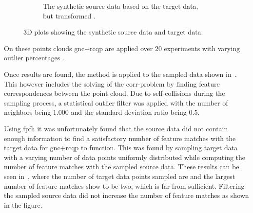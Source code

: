 \begin{figure}[!h]
\begin{subfigure}[b]{0.48\textwidth}
		\caption{The synthetic source data based on the target data, but transformed .}
		\label{fig:synthetic-target-data}
	\end{subfigure}
	\caption{3D plots showing the synthetic source data and target data.}
	\label{fig:synthetic-source-and-target-data}
\end{figure}

On these points clouds \gls{gnc}+\gls{rcqp} are applied over \num{20} experiments with varying outlier percentages . \medskip

Once results are found, the method is applied to the sampled data shown in~. This however includes the solving of the \gls{corr-problem} by finding feature correspondences between the point cloud. Due to self-collisions during the sampling process, a statistical outlier filter was applied with the number of neighbors  being \num{1,000} and the standard deviation ratio \mvar{\sigma} being \num{0.5}.\medskip

Using \gls{fpfh} it was unfortunately found that the source data did not contain enough information to find a satisfactory number of feature matches with the target data for \gls{gnc}+\gls{rcqp} to function. This was found by sampling target data with a varying number of data points uniformly distributed while computing the number of feature matches with the sampled source data. These results can be seen in~, where the number of target data points sampled are  and the largest number of feature matches show to be two, which is far from sufficient. Filtering the sampled source data did not increase the number of feature matches as shown in the figure.

